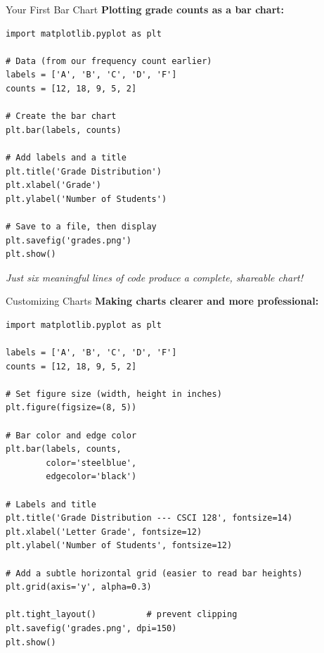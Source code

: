 \documentclass{csbeamer}
\begin{document}
\begin{frame}[fragile]{Your First Bar Chart}
    \textbf{Plotting grade counts as a bar chart:}

    \begin{lstlisting}
import matplotlib.pyplot as plt

# Data (from our frequency count earlier)
labels = ['A', 'B', 'C', 'D', 'F']
counts = [12, 18, 9, 5, 2]

# Create the bar chart
plt.bar(labels, counts)

# Add labels and a title
plt.title('Grade Distribution')
plt.xlabel('Grade')
plt.ylabel('Number of Students')

# Save to a file, then display
plt.savefig('grades.png')
plt.show()
    \end{lstlisting}

    \pause

    \begin{center}
        \textit{Just six meaningful lines of code produce a complete, shareable chart!}
    \end{center}
\end{frame}

\begin{frame}[fragile]{Customizing Charts}
    \textbf{Making charts clearer and more professional:}

    \begin{lstlisting}
import matplotlib.pyplot as plt

labels = ['A', 'B', 'C', 'D', 'F']
counts = [12, 18, 9, 5, 2]

# Set figure size (width, height in inches)
plt.figure(figsize=(8, 5))

# Bar color and edge color
plt.bar(labels, counts,
        color='steelblue',
        edgecolor='black')

# Labels and title
plt.title('Grade Distribution --- CSCI 128', fontsize=14)
plt.xlabel('Letter Grade', fontsize=12)
plt.ylabel('Number of Students', fontsize=12)

# Add a subtle horizontal grid (easier to read bar heights)
plt.grid(axis='y', alpha=0.3)

plt.tight_layout()          # prevent clipping
plt.savefig('grades.png', dpi=150)
plt.show()
    \end{lstlisting}
\end{frame}
\end{document}
